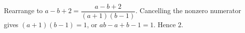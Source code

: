 Rearrange to $a-b+2=\dfrac{a-b+2}{(a+1)(b-1)}$. Cancelling the nonzero numerator gives $(a+1)(b-1)=1$, or $ab-a+b-1=1$. Hence $\boxed2$.
